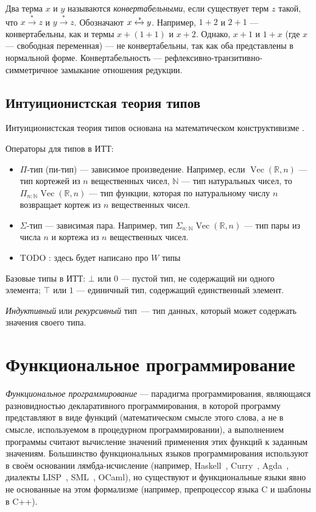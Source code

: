 Два терма $x$ и $y$ называются \emph{конвертабельными},
если существует терм $z$ такой, что $x \xrightarrow{*} z$ и $y \xrightarrow{*} z$. Обозначают  $x \xleftrightarrow{*} y$.
Например, $1+2$ и $2+1$ — конвертабельны, как и термы
$x + (1 + 1)$ и $x + 2$. Однако, $x+1$ и $1+x$ (где $x$ — свободная переменная)
— не конвертабельны, так как оба представлены в нормальной форме.
Конвертабельность — рефлексивно-транзитивно-симметричное замыкание отношения
редукции.

\subsection{Интуиционистская теория типов}

Интуиционистская теория типов основана на математическом конструктивизме \cite{MLTT}.

Операторы для типов в ИТТ:
\begin{itemize}
    \item $\Pi$-тип (пи-тип) — зависимое произведение.
        Например, если $\operatorname{Vec}({\mathbb R}, n)$ — тип кортежей из $n$ вещественных чисел,
        $\mathbb N$ — тип натуральных чисел, то
        $\Pi_{n \mathbin{:} {\mathbb N}} \operatorname{Vec}({\mathbb R}, n)$ 
        — тип функции, которая по натуральному числу $n$ возвращает кортеж из
        $n$ вещественных чисел.
    \item $\Sigma$-тип — зависимая пара.
        Например, тип $\Sigma_{n \mathbin{:} {\mathbb N}} \operatorname{Vec}({\mathbb R}, n)$ — тип 
        пары из числа $n$ и кортежа из $n$ вещественных чисел.
    \item TODO : здесь будет написано про $W$ типы
\end{itemize}
Базовые типы в ИТТ:
$\bot$ или $0$ — пустой тип, не содержащий ни одного элемента;
$\top$ или $1$ — единичный тип, содержащий единственный элемент.

\emph{Индуктивный} или \emph{рекурсивный} тип~— тип данных, который может
содержать значения своего типа.

\section{Функциональное программирование}

\emph{Функциональное программирование} — парадигма программирования,
являющаяся разновидностью декларативного программирования,
в которой программу представляют в виде функций
(математическом смысле этого слова, а не в смысле, используемом в процедурном программировании),
а выполнением программы считают вычисление значений применения этих функций к заданным значениям.
Большинство функциональных языков программирования используют в своём основании лямбда-исчисление
(например, Haskell~\cite{HaskellLang}, Curry~\cite{CurryLang}, Agda~\cite{AgdaLang},
диалекты LISP~\cite{SchemeLang,ClojureLang,SICP}, SML~\cite{SMLLang}, OCaml\cite{OCamlLang}),
но существуют и функциональные языки явно не основанные на этом формализме
(например, препроцессор языка C и шаблоны в C++).

